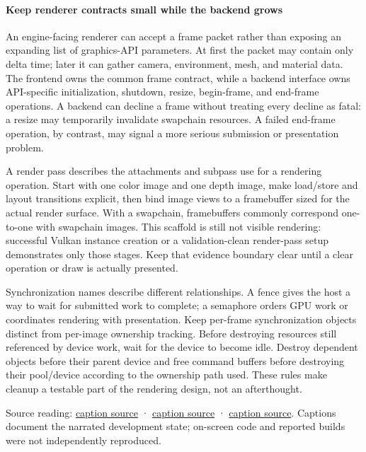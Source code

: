 \paragraph{Keep renderer contracts small while the backend grows}\label{keep-renderer-contracts-small-while-the-backend-grows}

An engine-facing renderer can accept a frame packet rather than exposing an expanding list of graphics-API parameters. At first the packet may contain only delta time; later it can gather camera, environment, mesh, and material data. The frontend owns the common frame contract, while a backend interface owns API-specific initialization, shutdown, resize, begin-frame, and end-frame operations. A backend can decline a frame without treating every decline as fatal: a resize may temporarily invalidate swapchain resources. A failed end-frame operation, by contrast, may signal a more serious submission or presentation problem.

A render pass describes the attachments and subpass use for a rendering operation. Start with one color image and one depth image, make load/store and layout transitions explicit, then bind image views to a framebuffer sized for the actual render surface. With a swapchain, framebuffers commonly correspond one-to-one with swapchain images. This scaffold is still not visible rendering: successful Vulkan instance creation or a validation-clean render-pass setup demonstrates only those stages. Keep that evidence boundary clear until a clear operation or draw is actually presented.

Synchronization names describe different relationships. A fence gives the host a way to wait for submitted work to complete; a semaphore orders GPU work or coordinates rendering with presentation. Keep per-frame synchronization objects distinct from per-image ownership tracking. Before destroying resources still referenced by device work, wait for the device to become idle. Destroy dependent objects before their parent device and free command buffers before destroying their pool/device according to the ownership path used. These rules make cleanup a testable part of the rendering design, not an afterthought.

Source reading: \href{https://www.youtube.com/watch?v=70q9jtjWP4o}{caption source} · \href{https://www.youtube.com/watch?v=4M1hKSFxhWw}{caption source} · \href{https://www.youtube.com/watch?v=Is6CwlsaCFE}{caption source}. Captions document the narrated development state; on-screen code and reported builds were not independently reproduced.

